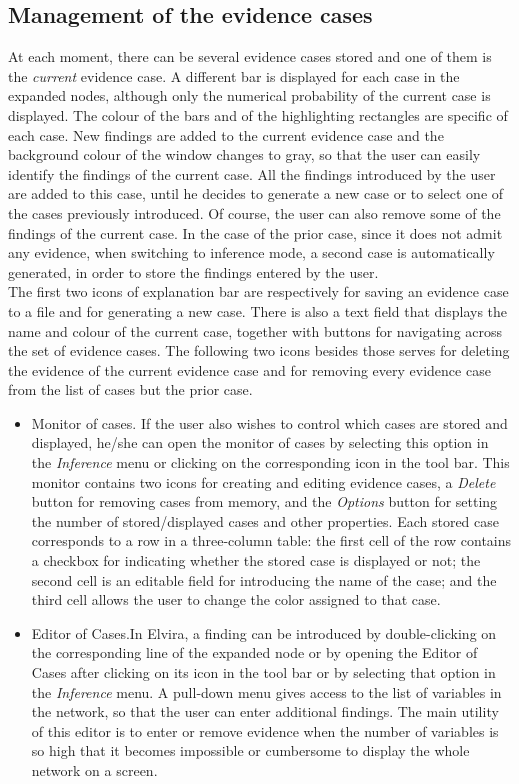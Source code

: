 \subsection{Management of the evidence cases}
\label{sec:caseslist} At each moment, there can be several
evidence cases stored and one of them is the \emph{current}
evidence case. A different bar is displayed for each case in the
expanded nodes, although only the numerical probability of the
current case is displayed. The colour of the bars and of the
highlighting rectangles are specific of each case. New findings
are added to the current evidence case and the background colour
of the window changes to gray, so that the user can easily
identify the findings of the current case. All the findings
introduced by the user are added to this case, until he decides to
generate a new case or to select one of the cases previously
introduced. Of course, the user can also remove some of the
findings of the current case. In the case of the prior case, since
it does not admit any evidence, when switching to inference
mode, a second case is automatically generated, in order to store the findings entered by the user. \\
The first two icons of explanation bar are respectively for saving
an evidence case to a file and for generating a new case. There is
also a text field that displays the name and colour of the current
case, together with buttons for navigating across the set of
evidence cases. The following two icons besides those serves for
deleting the evidence of the current evidence case and for
removing every evidence case from the list of cases but the prior
case.
\begin{itemize}
\item  {Monitor of cases}. If the user also wishes to
control which cases are stored and displayed, he/she can open the
monitor of cases by selecting this option in the \emph{Inference}
menu or clicking on the corresponding icon in the tool bar. This
monitor contains two icons for creating and editing evidence
cases, a \emph{Delete} button for removing cases from memory, and
the \emph{Options} button for setting the number of
stored/displayed cases and other properties. Each stored case
corresponds to a row in a three-column table: the first cell of
the row contains a checkbox for indicating whether the stored case
is displayed or not; the second cell is an editable field for
introducing the name of the case; and the third cell allows the
user to change the color assigned to that case.

\item  {Editor of Cases}.In Elvira, a finding can be introduced by double-clicking on the
corresponding line of the expanded node or by opening the Editor
of Cases after clicking on its icon in the tool bar or by
selecting that option in the \emph{Inference} menu. A pull-down
menu gives access to the list of variables in the network, so that
the user can enter additional findings. The main utility of this
editor is to enter or remove evidence when the number of variables
is so high that it becomes impossible or cumbersome to display the
whole network on a screen.\end{itemize}
